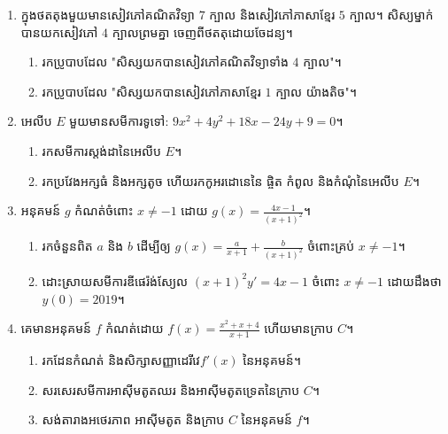 \documentclass{officialexam}
\begin{document}
  \maketitle
  \begin{center}
  \end{center}
  \begin{enumerate}[I]
  	\item ក្នុងថតតុងមួយមានសៀវភៅគណិតវិទ្យា $7$ ក្បាល និងសៀវភៅភាសាខ្មែរ $5$ ក្បាល។ សិស្យម្នាក់បានយកសៀវភៅ $4$ ក្បាលព្រមគ្នា ចេញពីថតតុដោយចែដន្យ។
  	\begin{enumerate}[k]
  		\item រកប្រូបាបដែល "សិស្សយកបានសៀវភៅគណិតវិទ្យាទាំង $4$ ក្បាល"។
  		\item រកប្រូបាបដែល "សិស្សយកបានសៀវភៅភាសាខ្មែរ $1$  ក្បាល យ៉ាងតិច"។
  	\end{enumerate}
  	\item អេលីប $E$ មួយមានសមីការទូទៅ: $9x^2+4y^2+18x-24y+9=0$។
  	\begin{enumerate}[k]
  		\item រកសមីការស្តង់ដានៃអេលីប $E$។
  		\item រកប្រវែងអក្សធំ និងអក្សតូច ហើយរកកូអរដោនេនៃ ផ្ចិត កំពូល និងកំណុំនៃអេលីប $E$។
  	\end{enumerate}
  	\item អនុគមន៍ $g$ កំណត់ចំពោះ $x\ne -1$ ដោយ $g(x)=\frac{4x-1}{\left(x+1\right)^2}$។
  	\begin{enumerate}[k]
  		\item រកចំនួនពិត $a$ និង $b$ ដើម្បីឲ្យ $g(x)=\frac{a}{x+1}+\frac{b}{\left(x+1\right)^2}$ ចំពោះគ្រប់ $x\ne-1$។
  		\item ដោះស្រាយសមីការឌីផេរ៉ង់ស្យែល $\left(x+1\right)^2y'=4x-1$ ចំពោះ $x\ne -1$ ដោយដឹងថា $y(0)=2019$។
  	\end{enumerate}
  	\item គេមានអនុគមន៍ $f$ កំណត់ដោយ $f(x)=\frac{x^2+x+4}{x+1}$ ហើយមានក្រាប $C$។
  	\begin{enumerate}[k]
  		\item រកដែនកំណត់ និងសិក្សាសញ្ញាដេរីវេ​ $f'(x)$ នៃអនុគមន៍។
  		\item សរសេរសមីការអាសុីមតូតឈរ និងអាសុីមតូតទ្រេតនៃក្រាប $C$។
  		\item សង់តារាងអថេរភាព អាសុីមតូត និងក្រាប $C$ នៃអនុគមន៍ $f$។
  	\end{enumerate}
  \end{enumerate}
  \newpage
  \maketitle
\end{document}
